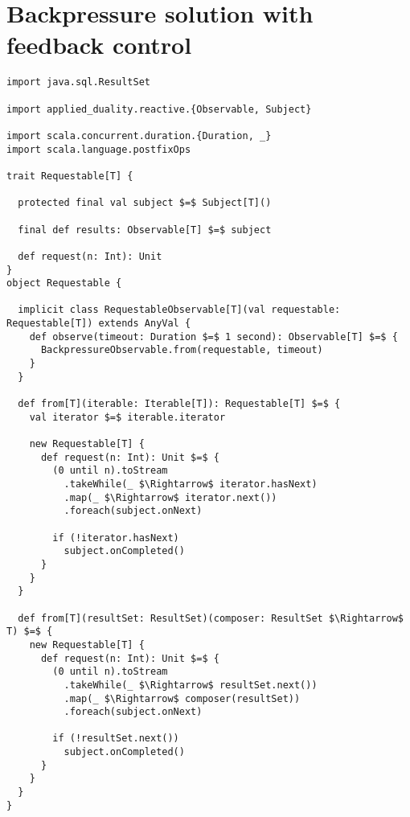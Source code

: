 \chapter{Backpressure solution with feedback control}
\label{app:backpressure-solution}

\begin{lstlisting}[style=ScalaStyle, caption={Universal, interactive interface, \code{Requestable}, used in the feedback system}]
import java.sql.ResultSet

import applied_duality.reactive.{Observable, Subject}

import scala.concurrent.duration.{Duration, _}
import scala.language.postfixOps

trait Requestable[T] {

  protected final val subject $=$ Subject[T]()

  final def results: Observable[T] $=$ subject

  def request(n: Int): Unit
}
object Requestable {

  implicit class RequestableObservable[T](val requestable: Requestable[T]) extends AnyVal {
    def observe(timeout: Duration $=$ 1 second): Observable[T] $=$ {
      BackpressureObservable.from(requestable, timeout)
    }
  }

  def from[T](iterable: Iterable[T]): Requestable[T] $=$ {
    val iterator $=$ iterable.iterator

    new Requestable[T] {
      def request(n: Int): Unit $=$ {
        (0 until n).toStream
          .takeWhile(_ $\Rightarrow$ iterator.hasNext)
          .map(_ $\Rightarrow$ iterator.next())
          .foreach(subject.onNext)

        if (!iterator.hasNext)
          subject.onCompleted()
      }
    }
  }

  def from[T](resultSet: ResultSet)(composer: ResultSet $\Rightarrow$ T) $=$ {
    new Requestable[T] {
      def request(n: Int): Unit $=$ {
        (0 until n).toStream
          .takeWhile(_ $\Rightarrow$ resultSet.next())
          .map(_ $\Rightarrow$ composer(resultSet))
          .foreach(subject.onNext)

        if (!resultSet.next())
          subject.onCompleted()
      }
    }
  }
}
\end{lstlisting}

